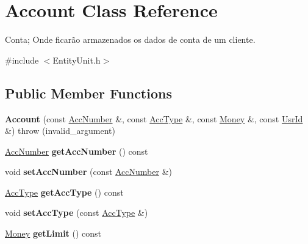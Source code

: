 \hypertarget{classAccount}{\section{Account Class Reference}
\label{classAccount}
}


Conta; Onde ficarão armazenados os dados de conta de um cliente.  




{\ttfamily \#include $<$Entity\-Unit.\-h$>$}

\subsection*{Public Member Functions}
\begin{DoxyCompactItemize}
\item 
\hypertarget{classAccount_a26dcd22e552626c14728150a671608a1}{{\bfseries Account} (const \hyperlink{classAccNumber}{Acc\-Number} \&, const \hyperlink{classUsrType}{Acc\-Type} \&, const \hyperlink{classMoney}{Money} \&, const \hyperlink{classUsrId}{Usr\-Id} \&)  throw (invalid\-\_\-argument)}\label{classAccount_a26dcd22e552626c14728150a671608a1}

\item 
\hypertarget{classAccount_a74f26f24e13e66a055bb8441dfb3d881}{\hyperlink{classAccNumber}{Acc\-Number} {\bfseries get\-Acc\-Number} () const }\label{classAccount_a74f26f24e13e66a055bb8441dfb3d881}

\item 
\hypertarget{classAccount_a3e669090168f13d2a8269af456546a1e}{void {\bfseries set\-Acc\-Number} (const \hyperlink{classAccNumber}{Acc\-Number} \&)}\label{classAccount_a3e669090168f13d2a8269af456546a1e}

\item 
\hypertarget{classAccount_a34e1f7e507d7abdf575e4833d6f8d36b}{\hyperlink{classUsrType}{Acc\-Type} {\bfseries get\-Acc\-Type} () const }\label{classAccount_a34e1f7e507d7abdf575e4833d6f8d36b}

\item 
\hypertarget{classAccount_a3a8e8aa0094b2af0496d45714f694256}{void {\bfseries set\-Acc\-Type} (const \hyperlink{classUsrType}{Acc\-Type} \&)}\label{classAccount_a3a8e8aa0094b2af0496d45714f694256}

\item 
\hypertarget{classAccount_ac67a380f5f320a44f9bb464f6efd59f7}{\hyperlink{classMoney}{Money} {\bfseries get\-Limit} () const }\label{classAccount_ac67a380f5f320a44f9bb464f6efd59f7}


\end{DoxyCompactItemize}

